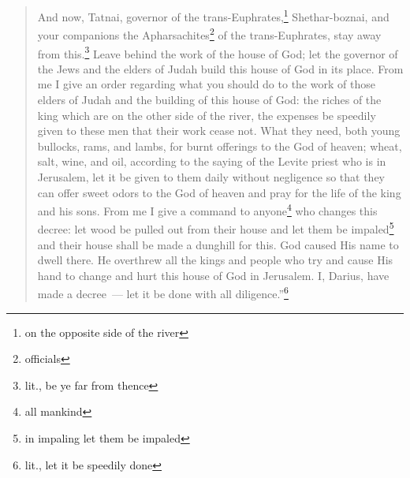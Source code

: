 \begin{quotation}
\begin{inparaenum}
         And now, Tatnai, governor of the trans-Euphrates,\footnote{on the opposite side of the river} Shethar-boznai, and your companions the Apharsachites\footnote{officials} of the trans-Euphrates, stay away from this.\footnote{lit., be ye far from thence}%
         Leave behind the work of the house of God; let the governor of the Jews and the elders of Judah build this house of God in its place.%
         From me I give an order regarding what you should do to the work of those elders of Judah and the building of this house of God: the riches of the king which are on the other side of the river, the expenses be speedily given to these men that their work cease not.%
         What they need, both young bullocks, rams, and lambs, for burnt offerings to the God of heaven; wheat, salt, wine, and oil, according to the saying of the Levite priest who is in Jerusalem, let it be given to them daily without negligence%
         so that they can offer sweet odors to the God of heaven and pray for the life of the king and his sons.%
         From me I give a command to anyone\footnote{all mankind} who changes this decree: let wood be pulled out from their house and let them be impaled\footnote{in impaling let them be impaled} and their house shall be made a dunghill for this.%
         God caused His name to dwell there. He overthrew all the kings and people who try and cause His hand to change and hurt this house of God in Jerusalem. I, Darius, have made a decree~--- let it be done with all diligence.''\footnote{lit., let it be speedily done}%
    \end{inparaenum}
\end{quotation}
